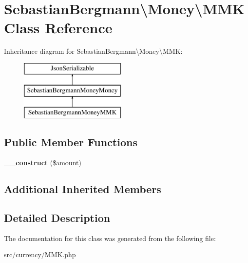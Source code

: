 \hypertarget{classSebastianBergmann_1_1Money_1_1MMK}{}\section{Sebastian\+Bergmann\textbackslash{}Money\textbackslash{}M\+M\+K Class Reference}
\label{classSebastianBergmann_1_1Money_1_1MMK}
Inheritance diagram for Sebastian\+Bergmann\textbackslash{}Money\textbackslash{}M\+M\+K\+:\begin{figure}[H]
\begin{center}
\leavevmode
\includegraphics[height=3.000000cm]{classSebastianBergmann_1_1Money_1_1MMK}
\end{center}
\end{figure}
\subsection*{Public Member Functions}
\begin{DoxyCompactItemize}
\item 
\hypertarget{classSebastianBergmann_1_1Money_1_1MMK_a59d266583ae69c2145c955dc9e5d91dc}{}{\bfseries \+\_\+\+\_\+construct} (\$amount)\label{classSebastianBergmann_1_1Money_1_1MMK_a59d266583ae69c2145c955dc9e5d91dc}

\end{DoxyCompactItemize}
\subsection*{Additional Inherited Members}


\subsection{Detailed Description}


The documentation for this class was generated from the following file\+:\begin{DoxyCompactItemize}
\item 
src/currency/M\+M\+K.\+php\end{DoxyCompactItemize}
